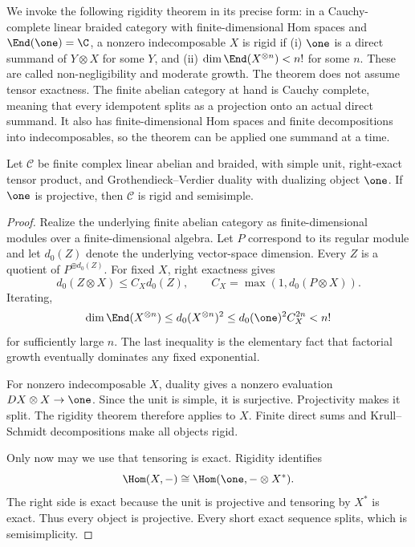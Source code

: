 We invoke the following rigidity theorem in its precise form: in a
Cauchy-complete linear braided category with finite-dimensional Hom
spaces and $\End(\one)=\C$, a nonzero indecomposable $X$ is rigid
if (i) $\one$ is a direct summand of $Y\otimes X$ for some $Y$, and
(ii) $\dim\End(X^{\otimes n})<n!$ for some $n$. These are called
non-negligibility and moderate growth. The theorem does not assume
tensor exactness.
The finite abelian category at hand is Cauchy complete, meaning that
every idempotent splits as a projection onto an actual direct summand.
It also has finite-dimensional Hom spaces and finite decompositions
into indecomposables, so the theorem can be applied one summand at a time.

\begin{proposition}
\label{prop:c-projective-unit}
Let $\mathcal C$ be finite complex linear abelian and braided, with
simple unit, right-exact tensor product, and Grothendieck--Verdier
duality with dualizing object $\one$. If $\one$ is projective, then
$\mathcal C$ is rigid and semisimple.
\end{proposition}
\begin{proof}
Realize the underlying finite abelian category as finite-dimensional
modules over a finite-dimensional algebra. Let $P$ correspond to its
regular module and let $d_0(Z)$ denote the underlying vector-space
dimension. Every $Z$ is a quotient of $P^{\oplus d_0(Z)}$.
For fixed $X$, right exactness gives
\[
 d_0(Z\otimes X)\leq C_Xd_0(Z),\qquad
 C_X=\max(1,d_0(P\otimes X)).
\]
Iterating,
\[
 \dim\End(X^{\otimes n})
 \leq d_0(X^{\otimes n})^2
 \leq d_0(\one)^2C_X^{2n}<n!
\]
for sufficiently large $n$. The last inequality is the elementary
fact that factorial growth eventually dominates any fixed exponential.

For nonzero indecomposable $X$, duality gives a nonzero evaluation
$DX\otimes X\to\one$. Since the unit is simple, it is surjective.
Projectivity makes it split. The rigidity theorem therefore applies
to $X$. Finite direct sums and Krull--Schmidt decompositions make all
objects rigid.

Only now may we use that tensoring is exact. Rigidity identifies
\[
 \Hom(X,-)\cong\Hom(\one,-\otimes X^*).
\]
The right side is exact because the unit is projective and tensoring
by $X^*$ is exact. Thus every object is projective. Every short exact
sequence splits, which is semisimplicity.
\end{proof}

